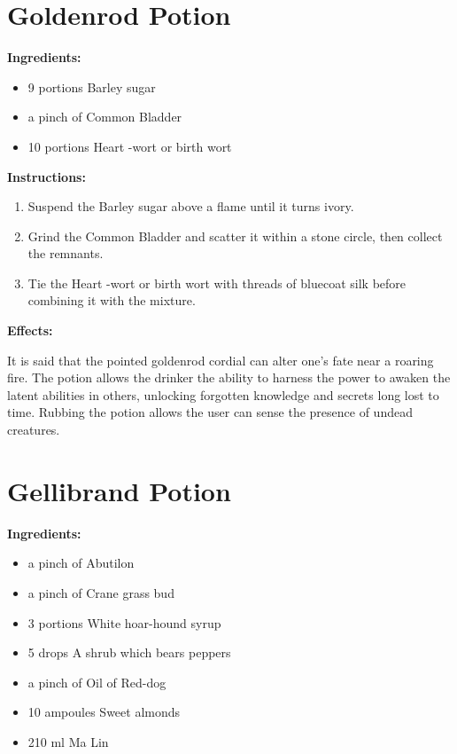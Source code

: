 \documentclass{article}
\begin{document}
\newpage
\section*{Goldenrod Potion}

\textbf{Ingredients:}

\begin{itemize}
  \item 9 portions Barley sugar
  \item a pinch of Common Bladder
  \item 10 portions Heart -wort or birth wort
\end{itemize}

\textbf{Instructions:}

\begin{enumerate}
  \item Suspend the Barley sugar above a flame until it turns ivory.
  \item Grind the Common Bladder and scatter it within a stone circle, then collect the remnants.
  \item Tie the Heart -wort or birth wort with threads of bluecoat silk before combining it with the mixture.
\end{enumerate}

\textbf{Effects:}

It is said that the pointed goldenrod cordial can alter one's fate near a roaring fire. The potion allows the drinker the ability to harness the power to awaken the latent abilities in others, unlocking forgotten knowledge and secrets long lost to time. Rubbing the potion allows the user can sense the presence of undead creatures.

\newpage
\section*{Gellibrand Potion}

\textbf{Ingredients:}

\begin{itemize}
  \item a pinch of Abutilon
  \item a pinch of Crane grass bud
  \item 3 portions White hoar-hound syrup
  \item 5 drops A shrub which bears peppers
  \item a pinch of Oil of Red-dog
  \item 10 ampoules Sweet almonds
  \item 210 ml Ma Lin
\end{itemize}
\end{document}

